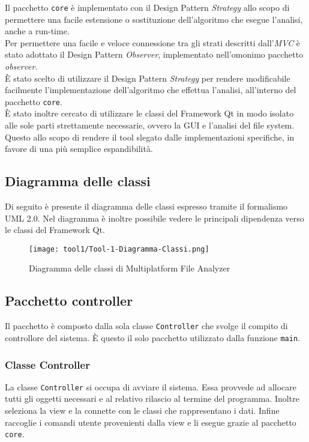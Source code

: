 	Il pacchetto \texttt{core} è implementato con il Design Pattern \textit{Strategy} allo scopo di permettere una facile estensione o sostituzione dell'algoritmo che esegue l'analisi, anche a run-time.\\
	
	Per permettere una facile e veloce connessione tra gli strati descritti dall'\textit{MVC} è stato adottato il Design Pattern \textit{Observer}, implementato nell'omonimo pacchetto \textit{observer}.\\
	
	È stato scelto di utilizzare il Design Pattern \textit{Strategy} per rendere modificabile facilmente l'implementazione dell'algoritmo che effettua l'analisi, all'interno del pacchetto \texttt{core}.\\
	
	È stato inoltre cercato di utilizzare le classi del Framework Qt\textsuperscript{\textregistered} in modo isolato alle sole parti strettamente necessarie, ovvero la GUI e l'analisi del file system. Questo allo scopo di rendere il tool slegato dalle implementazioni specifiche, in favore di una più semplice espandibilità.
	
	\subsection{Diagramma delle classi}
		Di seguito è presente il diagramma delle classi espresso tramite il formalismo UML 2.0. Nel diagramma è inoltre possibile vedere le principali dipendenza verso le classi del Framework Qt\textsuperscript{\textregistered}.
		
		\begin{figure}[!h] 
			\centering 
			\texttt{[image: tool1/Tool-1-Diagramma-Classi.png]} 
			\caption{Diagramma delle classi di Multiplatform File Analyzer}
		\end{figure}
	
		\newpage
	
	\subsection{Pacchetto controller}
		Il pacchetto è composto dalla sola classe \texttt{Controller} che svolge il compito di controllore del sistema. È questo il solo pacchetto utilizzato dalla funzione \texttt{main}.
		
		\subsubsection{Classe Controller}
			La classe \texttt{Controller} si occupa di avviare il sistema. Essa provvede ad allocare tutti gli oggetti necessari e al relativo rilascio al termine del programma. Inoltre seleziona la view e la connette con le classi che rappresentano i dati. Infine raccoglie i comandi utente provenienti dalla view e li esegue grazie al pacchetto \texttt{core}.
	
